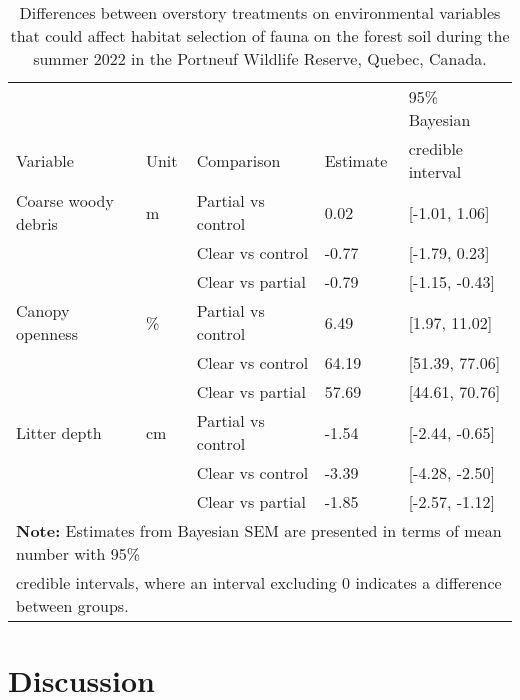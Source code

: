 \begin{table}[ht]
  \centering
  \caption[Differences between overstory treatments on environmental variables that could affect habitat selection of fauna on the forest soil.]
  {Differences between overstory treatments on environmental variables that could affect habitat selection of fauna on the forest soil during the summer 2022 in the Portneuf Wildlife Reserve,
  Quebec, Canada.}
  \label{tab:overstoryenvar}
  \begin{tabular}{lllll} 
      \hline
      &&&&95\% Bayesian \\
      Variable&Unit& Comparison & Estimate &  credible interval \\ [0.5ex] 
      \hline
      Coarse woody debris &m\up{3}& Partial vs control & \hspace{1mm}0.02 & [-1.01, 1.06] \\ 
                 && Clear vs control  & -0.77 & [-1.79, 0.23] \\ 
                          && Clear vs partial  & -0.79 & [-1.15, -0.43] \\
      Canopy openness     &\%& Partial vs control & \hspace{1mm}6.49 & [1.97, 11.02] \\ 
                      && Clear vs control  & \hspace{1mm}64.19 & [51.39, 77.06] \\ 
                          && Clear vs partial  & \hspace{1mm}57.69 & [44.61, 70.76] \\ 
      Litter depth        &cm& Partial vs control & -1.54 & [-2.44, -0.65] \\ 
                      && Clear vs control  & -3.39 & [-4.28, -2.50] \\ 
                          && Clear vs partial  & -1.85 & [-2.57, -1.12] \\       
      \hline
      \multicolumn{5}{l}{\textbf{Note:} Estimates from Bayesian SEM are presented in terms of mean number with 95\%} \\
      \multicolumn{5}{l}{credible intervals, where an interval excluding 0 indicates a difference between groups.} \\
  \end{tabular}
\end{table}




\clearpage

\section*{Discussion}
\label{sec:discu1}

